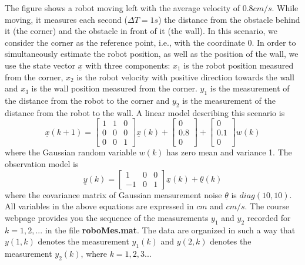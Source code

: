 \documentclass{article}
\begin{document}
\noindent The figure shows a robot moving left with the average velocity of $0.8cm/s$.
While moving, it measures each second ($\Delta T = 1s$) the distance from the obstacle
behind it (the corner) and the obstacle in front of it (the wall). In this scenario,
we consider the corner as the reference point, i.e., with the coordinate 0. 
In order to simultaneously estimate the robot position, as well
as the position of the wall, we use the state vector $\underline{x}$ with three components: 
$x_1$ is the robot position measured from the corner, $x_2$ is the robot velocity with
positive direction towards the wall and $x_3$ is the wall position measured from
the corner.  $y_1$ is the measurement of the distance from the robot to the corner
and $y_2$ is the measurement of the distance from the robot to the wall. A linear model describing this scenario is
\begin{equation}
  \underline{x}(k+1)=\left[ 
  \begin{array}{ccc}
     1 & 1 & 0  \\
     0 & 0 & 0  \\
     0 & 0 & 1 
  \end{array}
   \right] \underline{x}(k)+
   \left[ 
  \begin{array}{c}
     0   \\
     0.8   \\
     0
  \end{array}
   \right]+ \left[
     \begin{array}{c}
     0   \\
     0.1   \\
     0
  \end{array}
   \right] w(k)
\end{equation}
where the Gaussian random variable $w(k)$ has zero mean and variance 1. 
The observation model is
\begin{equation}
 \underline{y}(k) =\left[
     \begin{array}{ccc}
     1 & 0 &  0  \\
     -1 & 0 & 1   
  \end{array}
   \right] \underline{x}(k)+\underline{\theta}(k)
\end{equation}
where the covariance matrix of Gaussian measurement noise $\underline{\theta}$ is $diag(10, 10)$. All variables in the above equations are expressed in $cm$ and $cm/s$. The course webpage provides you the sequence of the measurements $y_1$ and $y_2$ recorded for 
$k = 1, 2,... $ in the file {\bf roboMes.mat}. The data are organized in such a way that $y(1, k)$ denotes the measurement $y_1(k)$ and $y(2, k)$ denotes the measurement $y_2(k)$, where $k=1,2,3...$
\end{document}
